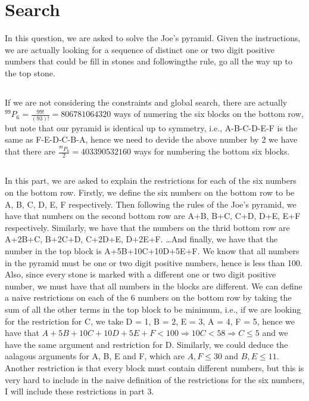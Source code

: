 \documentclass[12pt]{article}\usepackage[]{graphicx}\usepackage[]{color}
\begin{document}
\newpage
\section{Search}
In this question, we are asked to solve the Joe's pyramid. Given the instructions, we are actually looking for a sequence of distinct one or two digit positive numbers that could be fill in stones and followingthe rule, go all the way up to the top stone.
\subsection{}
\newcommand*{\Perm}[2]{{}^{#1}\!P_{#2}}%
If we are not considering the constraints and global search, there are actually $\Perm{99}{6}=\frac{99!}{(93)!} = 806781064320$ ways of numering the six blocks on the bottom row, but note that our pyramid is identical up to symmetry, i.e., A-B-C-D-E-F is the same as F-E-D-C-B-A, hence we need to devide the above number by 2 we have that there are $\frac{\Perm{99}{6}}{2} = 403390532160$ ways for numbering the bottom six blocks.
\subsection{}
In this part, we are asked to explain the restrictions for each of the six numbers on the bottom row. Firstly, we define the six numbers on the bottom row to be A, B, C, D, E, F respectively. Then following the rules of the Joe's pyramid, we have that numbers on the second bottom row are A+B, B+C, C+D, D+E, E+F respectively. Similarly, we have that the numbers on the thrid bottom row are A+2B+C, B+2C+D, C+2D+E, D+2E+F. \dots And finally, we have that the number in the top block is A+5B+10C+10D+5E+F. We know that all numbers in the pyramid must be one or two digit positive numbers, hence is less than 100. Also, since every stone is marked with a different one or two digit positive number, we must have that all numbers in the blocks are different. We can define a naive restrictions on each of the 6 numbers on the bottom row by taking the sum of all the other terms in the top block to be minimum, i.e., if we are looking for the restriction for C, we take D = 1, B = 2, E = 3, A = 4, F = 5, hence we have that $A+5B+10C+10D+5E+F < 100 \Rightarrow 10C < 58 \Rightarrow C \leq 5$ and we have the same argument and restriction for D. Similarly, we could deduce the aalagous arguments for A, B, E and F, which are $A, F \leq 30$ and $B, E \leq 11$. Another restriction is that every block must contain different numbers, but this is very hard to include in the naive definition of the restrictions for the six numbers, I will include these restrictions in part 3.
\end{document}

